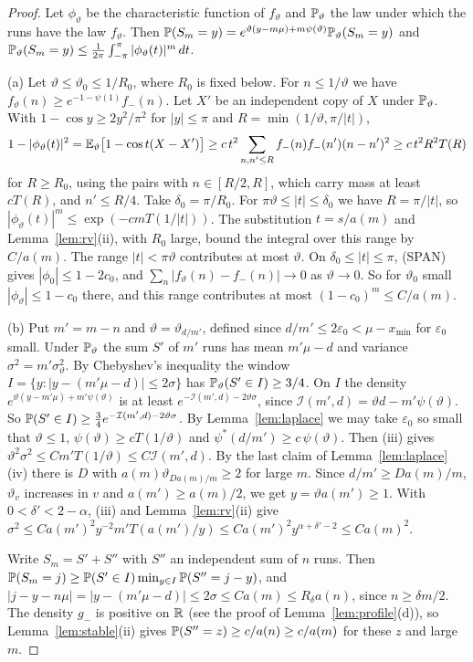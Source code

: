 \begin{proof}
Let $\phi_\vartheta$ be the characteristic function of $f_\vartheta$ and $\mathbb{P}_\vartheta$ the law
under which the runs have the law $f_\vartheta$. Then
$\mathbb{P}(S_m=y)=e^{\vartheta(y-m\mu)+m\psi(\vartheta)}\mathbb{P}_\vartheta(S_m=y)$ and
$\mathbb{P}_\vartheta(S_m=y)\le\frac1{2\pi}\int_{-\pi}^\pi|\phi_\vartheta(t)|^m\,dt$.

(a) Let $\vartheta\le\vartheta_0\le1/R_0$, where $R_0$ is fixed below. For $n\le1/\vartheta$ we
have $f_\vartheta(n)\ge e^{-1-\psi(1)}f_\minus(n)$. Let $X'$ be an independent copy of $X$
under $\mathbb{P}_\vartheta$. With $1-\cos y\ge2y^2/\pi^2$ for $|y|\le\pi$ and
$R=\min(1/\vartheta,\pi/|t|)$,
\[
 1-|\phi_\vartheta(t)|^2=\mathbb{E}_\vartheta\bigl[1-\cos t(X-X')\bigr]
 \ge c\,t^2\sum_{n,n'\le R}f_{-}(n)f_{-}(n')(n-n')^2\ge c\,t^2R^2T(R)
\]
for $R\ge R_0$, using the pairs with $n\in[R/2,R]$, which carry mass at least $cT(R)$, and
$n'\le R/4$. Take $\delta_0=\pi/R_0$. For $\pi\vartheta\le|t|\le\delta_0$ we have
$R=\pi/|t|$, so $|\phi_\vartheta(t)|^m\le\exp(-cmT(1/|t|))$. The substitution $t=s/a(m)$ and
Lemma~\ref{lem:rv}(ii), with $R_0$ large, bound the integral over this range by $C/a(m)$. The
range $|t|<\pi\vartheta$ contributes at most $\vartheta$. On $\delta_0\le|t|\le\pi$, (SPAN) gives
$|\phi_0|\le1-2c_0$, and $\sum_n|f_\vartheta(n)-f_\minus(n)|\to0$ as $\vartheta\to0$. So for
$\vartheta_0$ small $|\phi_\vartheta|\le1-c_0$ there, and this range contributes at most
$(1-c_0)^m\le C/a(m)$.

(b) Put $m'=m-n$ and $\vartheta=\vartheta_{d/m'}$, defined since $d/m'\le2\varepsilon_0<\mu-x_{\min}$
for $\varepsilon_0$ small. Under $\mathbb{P}_\vartheta$ the sum $S'$ of $m'$ runs has mean $m'\mu-d$ and
variance $\sigma^2=m'\sigma^2_\vartheta$. By Chebyshev's inequality the window
$I=\{y:|y-(m'\mu-d)|\le2\sigma\}$ has $\mathbb{P}_\vartheta(S'\in I)\ge3/4$. On $I$ the density
$e^{\vartheta(y-m'\mu)+m'\psi(\vartheta)}$ is at least $e^{-\mathcal I(m',d)-2\vartheta\sigma}$,
since $\mathcal I(m',d)=\vartheta d-m'\psi(\vartheta)$. So
$\mathbb{P}(S'\in I)\ge\frac34e^{-\mathcal I(m',d)-2\vartheta\sigma}$. By Lemma~\ref{lem:laplace} we
may take $\varepsilon_0$ so small that $\vartheta\le1$, $\psi(\vartheta)\ge cT(1/\vartheta)$ and
$\psi^*(d/m')\ge c\,\psi(\vartheta)$. Then (iii) gives
$\vartheta^2\sigma^2\le Cm'T(1/\vartheta)\le C\mathcal I(m',d)$. By the last claim of
Lemma~\ref{lem:laplace}(iv) there is $D$ with $a(m)\vartheta_{Da(m)/m}\ge2$ for large $m$.
Since $d/m'\ge Da(m)/m$, $\vartheta_v$ increases in $v$ and $a(m')\ge a(m)/2$, we get
$y=\vartheta a(m')\ge1$. With $0<\delta'<2-\alpha$, (iii) and Lemma~\ref{lem:rv}(ii) give
$\sigma^2\le Ca(m')^2y^{-2}m'T(a(m')/y)\le Ca(m')^2y^{\alpha+\delta'-2}\le Ca(m)^2$.

Write $S_m=S'+S''$ with $S''$ an independent sum of $n$ runs. Then
$\mathbb{P}(S_m=j)\ge\mathbb{P}(S'\in I)\min_{y\in I}\mathbb{P}(S''=j-y)$, and
$|j-y-n\mu|=|y-(m'\mu-d)|\le2\sigma\le Ca(m)\le R_\delta a(n)$, since $n\ge\delta m/2$. The
density $g_\minus$ is positive on $\mathbb{R}$ (see the proof of Lemma~\ref{lem:profile}(d)), so
Lemma~\ref{lem:stable}(ii) gives $\mathbb{P}(S''=z)\ge c/a(n)\ge c/a(m)$ for these $z$ and large $m$.
\end{proof}


